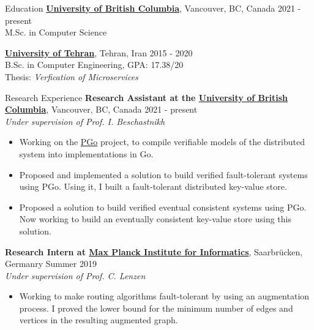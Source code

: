 \documentclass{resume} %
\begin{document}
	

\begin{rSection}{Education}
	{\bf \href{https://www.ubc.ca/}{University of British Columbia}}, Vancouver, BC, Canada \hfill 2021 - present
	\\M.Sc. in Computer Science
	
	{\bf \href{http://ut.ac.ir/en}{University of Tehran}}, Tehran, Iran \hfill 2015 - 2020 
	\\B.Sc. in Computer Engineering, GPA: 17.38/20 
    \\Thesis: \textit{Verfication of Microservices}
\end{rSection}


\begin{rSection}{Research Experience}
	{\bf Research Assistant at the \href{https://www.ubc.ca/}{University of British Columbia}}, {Vancouver, BC, Canada \hfill 2021 - present}
	\\ \textit{Under supervision of Prof. I. Beschastnikh} \smallskip
	\vspace{-0.5em}
	\begin{itemize}[leftmargin=3mm]
		\setlength{\itemsep}{1pt}
		\setlength{\parskip}{0pt}
		\setlength{\parsep}{0pt}
		\renewcommand\labelitemi{$\cdot$}

		\item Working on the \href{https://github.com/UBC-NSS/pgo}{PGo} project, to compile verifiable models of the distributed system into implementations in Go.
		\item Proposed and implemented a solution to build verified fault-tolerant systems using PGo. Using it, I built a fault-tolerant distributed key-value store.
		\item Proposed a solution to build verified eventual consistent systems using PGo. Now working to build an eventually consistent key-value store using this solution.
	\end{itemize}

	{\bf Research Intern at \href{https://www.mpi-inf.mpg.de/}{Max Planck Institute for Informatics}}, {Saarbr{\"u}cken, Germanry \hfill Summer 2019}
	\\ \textit{Under supervision of Prof. C. Lenzen} \smallskip
	\vspace{-0.5em}
	\begin{itemize}[leftmargin=3mm]
		\setlength{\itemsep}{1pt}
		\setlength{\parskip}{0pt}
		\setlength{\parsep}{0pt}
		\renewcommand\labelitemi{$\cdot$}

		\item Working to make routing algorithms fault-tolerant by using an augmentation process. I proved the lower bound for the minimum number of edges 
		and vertices in the resulting augmented graph.
	\end{itemize}
\end{rSection}
\end{document}
